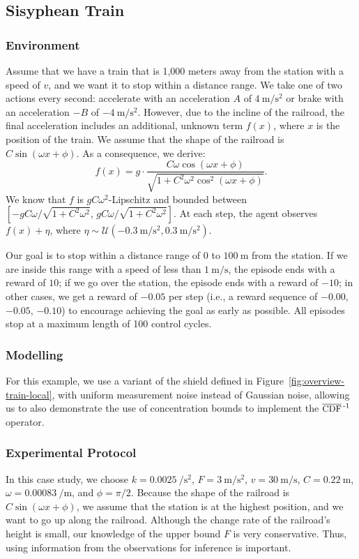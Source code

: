 \subsection{Sisyphean Train}\label{ap:sisyphean-train}

\subsubsection{Environment} Assume that we have a train that is 1,000 meters away from the station with a speed of $v$, and we want it to stop within a distance range. We take one of two actions every second: accelerate with an acceleration $A$ of $\qty{4}{\meter\per\second\squared}$ or brake with an acceleration $-B$ of $\qty{-4}{\meter\per\second\squared}$. However, due to the incline of the railroad, the final acceleration includes an additional, unknown term $f(x)$, where $x$ is the position of the train. We assume that the shape of the railroad is $C\sin(\omega x + \phi)$. As a consequence, we derive:
\[
    f(x) = g\cdot\frac{C\omega\cos(\omega x + \phi)}{\sqrt{1 + C^2\omega^2\cos^2(\omega x + \phi)}}.
\]
We know that $f$ is $gC\omega^2$-Lipschitz and bounded between $\left[-gC\omega/\sqrt{1 + C^2\omega^2}, \, gC\omega/\sqrt{1 + C^2\omega^2}\right]$. At each step, the agent observes $f(x) + \eta$, where $\eta \sim \mathcal{U}(\qty{-0.3}{\meter\per\second\squared}, \qty{0.3}{\meter\per\second\squared})$.


Our goal is to stop within a distance range of $0$ to $\qty{100}{\meter}$ from the station. If we are inside this range with a speed of less than $\qty{1}{\meter\per\second}$, the episode ends with a reward of $10$; if we go over the station, the episode ends with a reward of $-10$; in other cases, we get a reward of $-0.05$ per step (i.e., a reward sequence of $-0.00$, $-0.05$, $-0.10$) to encourage achieving the goal as early as possible. All episodes stop at a maximum length of 100 control cycles.

\subsubsection{Modelling} For this example, we use a variant of the shield defined in Figure~\ref{fig:overview-train-local}, with uniform measurement noise instead of Gaussian noise, allowing us to also demonstrate the use of concentration bounds to implement the $\InvCCDF$ operator.


\subsubsection{Experimental Protocol} In this case study, we choose $k=\qty{0.0025}{\per\second\squared}$, $F=\qty{3}{\meter\per\second\squared}$, $v=\qty{30}{\meter\per\second}$, $C=\qty{0.22}{\meter}$, $\omega=\qty{0.00083}{\per\meter}$, and $\phi=\pi/2$. Because the shape of the railroad is $C\sin(\omega x + \phi)$, we assume that the station is at the highest position, and we want to go up along the railroad. Although the change rate of the railroad's height is small, our knowledge of the upper bound $F$ is very conservative. Thus, using information from the observations for inference is important.

